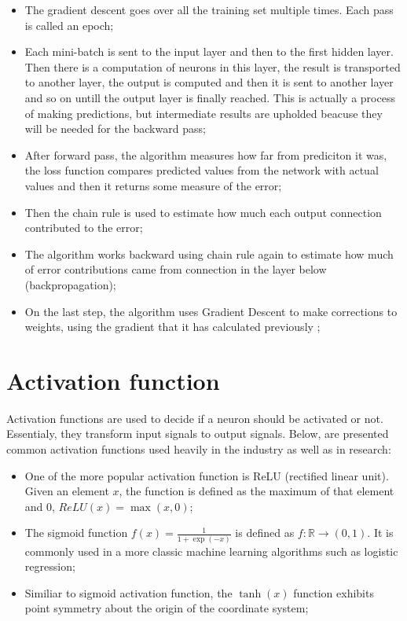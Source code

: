 \documentclass[a4paper,oneside,openright,11pt]{book}
\begin{document}
\begin{itemize}
    \item The gradient descent goes over all the training set multiple times. Each pass is called an epoch;
    \item Each mini-batch is sent to the input layer and then to the first hidden layer. Then there is a computation of neurons in this layer, the result is transported to another layer, the output is computed and then it is sent to another layer and so on untill the output layer is finally reached. This is actually a process of making predictions, but intermediate results are upholded beacuse they will be needed for the backward pass;
    \item After forward pass, the algorithm measures how far from prediciton it was, the loss function compares predicted values from the network with actual values and then it returns some measure of the error;
    \item Then the chain rule is used to estimate how much each output connection contributed to the error;
    \item The algorithm works backward using chain rule again to estimate how much of error contributions came from connection in the layer below (backpropagation);
    \item On the last step, the algorithm uses Gradient Descent to make corrections to weights, using the gradient that it has calculated previously \cite{aurelion};
\end{itemize}


\section{Activation function}

Activation functions are used to decide if a neuron should be activated or not. Essentialy, they transform input signals to output signals. Below, are presented common activation functions used heavily in the industry as well as in research:


\begin{itemize}
    \item One of the more popular activation function is ReLU (rectified linear unit). Given an element $x$, the function is defined as the maximum of that element and $0$, $ReLU(x) = \max(x, 0)$;
    \item The sigmoid function $f(x) = \frac{1}{1 + \exp(-x)}$ is defined as $f: \mathbb{R} \rightarrow (0, 1)$. It is commonly used in a more classic machine learning algorithms such as logistic regression;
    \item Similiar to sigmoid activation function, the $\tanh(x)$ function exhibits point symmetry about the origin of the coordinate system;
\end{itemize}
\end{document}
